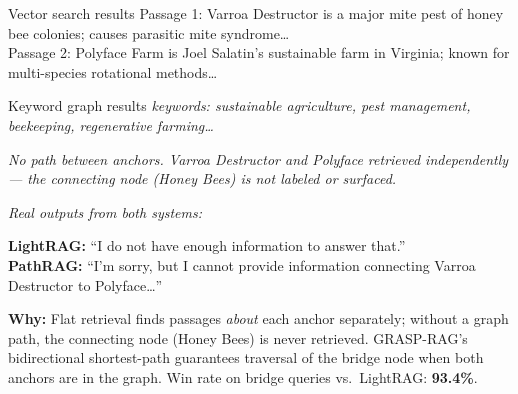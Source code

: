 \documentclass{article}
\begin{document}
\begin{minipage}[t]{0.485\textwidth}

\begin{tcolorbox}[
  colback=flatgray!5, colframe=flatgray!45, boxrule=1.1pt, arc=4pt,
  top=3pt, bottom=5pt, left=4pt, right=4pt,
  title={\scriptsize\bfseries\sffamily\color{white}
         LightRAG / PathRAG \textnormal{(flat retrieval)}},
  coltitle=white, colbacktitle=flatgray!65, attach title to upper,
]

\begin{flatbox}{Vector search results}
\scriptsize\sffamily\color{gray!80}
Passage 1: Varroa Destructor is a major mite pest of honey
bee colonies; causes parasitic mite syndrome\ldots\\[2pt]
Passage 2: Polyface Farm is Joel Salatin's sustainable farm
in Virginia; known for multi-species rotational methods\ldots
\end{flatbox}

\vspace{2pt}

\begin{flatbox}{Keyword graph results}
\scriptsize\sffamily\color{gray!80}
\textit{keywords: sustainable agriculture, pest management,
beekeeping, regenerative farming\ldots}
\end{flatbox}

\vspace{2pt}

{\scriptsize\sffamily\color{gray!60}
\textit{No path between anchors. Varroa Destructor and Polyface
retrieved independently — the connecting node (Honey Bees)
is not labeled or surfaced.}}

\vspace{4pt}

{\tiny\sffamily\color{flatgray!80}\textit{Real outputs from both systems:}}
\begin{tcolorbox}[colback=losecallout!7, colframe=losecallout!40,
  boxrule=0.7pt, arc=3pt, top=2pt, bottom=2pt, left=4pt, right=4pt]
\scriptsize\sffamily\color{losecallout!80!black}
\textbf{LightRAG:} ``I do not have enough information to answer that.''\\[3pt]
\textbf{PathRAG:} ``I'm sorry, but I cannot provide information
connecting Varroa Destructor to Polyface\ldots''\\[3pt]
\end{tcolorbox}

\vspace{4pt}
\begin{tcolorbox}[colback=yellow!8, colframe=yellow!60!orange,
  boxrule=0.7pt, arc=3pt, top=3pt, bottom=3pt, left=4pt, right=4pt]
\scriptsize\sffamily\color{black!70}
\textbf{Why:} Flat retrieval finds passages \emph{about} each anchor
separately; without a graph path, the connecting node (Honey Bees)
is never retrieved. GRASP-RAG's bidirectional shortest-path
guarantees traversal of the bridge node when both anchors
are in the graph. Win rate on bridge queries vs.\ LightRAG: \textbf{93.4\%}.
\end{tcolorbox}

\end{tcolorbox}
\end{minipage}
\end{document}
